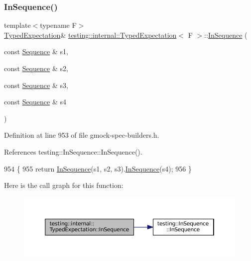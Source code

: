 \subsubsection{\texorpdfstring{In\+Sequence()}{InSequence()}\hspace{0.1cm}{\footnotesize\ttfamily [4/5]}}
{\footnotesize\ttfamily template$<$typename F$>$ \\
\hyperlink{classtesting_1_1internal_1_1TypedExpectation}{Typed\+Expectation}\& \hyperlink{classtesting_1_1internal_1_1TypedExpectation}{testing\+::internal\+::\+Typed\+Expectation}$<$ F $>$\+::\hyperlink{classtesting_1_1InSequence}{In\+Sequence} (\begin{DoxyParamCaption}\item[{const \hyperlink{classtesting_1_1Sequence}{Sequence} \&}]{s1,  }\item[{const \hyperlink{classtesting_1_1Sequence}{Sequence} \&}]{s2,  }\item[{const \hyperlink{classtesting_1_1Sequence}{Sequence} \&}]{s3,  }\item[{const \hyperlink{classtesting_1_1Sequence}{Sequence} \&}]{s4 }\end{DoxyParamCaption})\hspace{0.3cm}{\ttfamily [inline]}}



Definition at line 953 of file gmock-\/spec-\/builders.\+h.



References testing\+::\+In\+Sequence\+::\+In\+Sequence().


\begin{DoxyCode}
954                                                                        \{
955     \textcolor{keywordflow}{return} \hyperlink{classtesting_1_1internal_1_1TypedExpectation_ada9e9081a98435991310ac60483d1230}{InSequence}(s1, s2, s3).\hyperlink{classtesting_1_1internal_1_1TypedExpectation_ada9e9081a98435991310ac60483d1230}{InSequence}(s4);
956   \}
\end{DoxyCode}
Here is the call graph for this function\+:
\nopagebreak
\begin{figure}[H]
\begin{center}
\leavevmode
\includegraphics[width=350pt]{classtesting_1_1internal_1_1TypedExpectation_aa60bae1cf536651dc5efcd8110bea4fd_cgraph}
\end{center}
\end{figure}
\mbox{\label{classtesting_1_1internal_1_1TypedExpectation_ad8775f8ba9965d1836f6e4c09baf1c3e}} 

